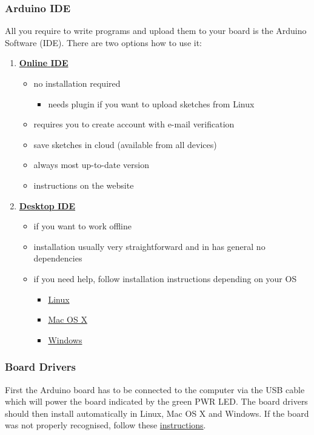\subsubsection{Arduino IDE}
All you require to write programs and upload them to your board is the Arduino Software (\ac{IDE}). There are two options how to use it:\newpage
%
\begin{enumerate}
  \item \href{https://create.arduino.cc}{\textbf{Online \ac{IDE}}}
  \begin{itemize}
    \item no installation required
    \begin{itemize}
      \item needs plugin if you want to upload sketches from Linux
    \end{itemize}
    \item requires you to create account with e-mail verification
    \item save sketches in cloud (available from all devices)
    \item always most up-to-date version
    \item instructions on the website
  \end{itemize}
%
  \item \href{https://www.arduino.cc/en/Main/Software#download}{\textbf{Desktop \ac{IDE}}}
  \begin{itemize}
    \item if you want to work offline
    \item installation usually very straightforward and in has general no dependencies
    \item if you need help, follow installation instructions depending on your \ac{OS}
    \begin{itemize}
      \item \href{https://www.arduino.cc/en/Guide/Linux}{Linux}
      \item \href{https://www.arduino.cc/en/Guide/MacOSX}{Mac OS X}
      \item \href{https://www.arduino.cc/en/Guide/Windows}{Windows}
    \end{itemize}
  \end{itemize}
\end{enumerate}
%
\subsubsection{Board Drivers}
First the Arduino board has to be connected to the computer via the \ac{USB} cable which will power the board indicated by the green \ac{PWR} LED. The board drivers should then install automatically in Linux, Mac OS X and Windows. If the board was not properly recognised, follow these \href{https://www.arduino.cc/en/Guide/ArduinoUno}{instructions}.
%
